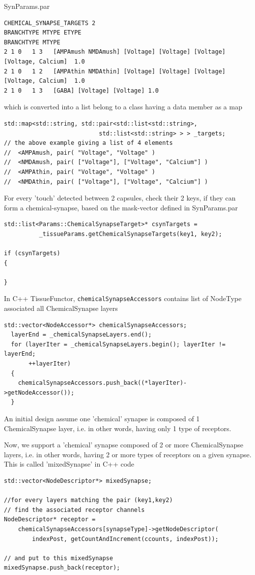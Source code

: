 SynParams.par
\begin{verbatim}
CHEMICAL_SYNAPSE_TARGETS 2
BRANCHTYPE MTYPE ETYPE
BRANCHTYPE MTYPE
2 1 0   1 3   [AMPAmush NMDAmush] [Voltage] [Voltage] [Voltage] [Voltage, Calcium]  1.0
2 1 0   1 2   [AMPAthin NMDAthin] [Voltage] [Voltage] [Voltage] [Voltage, Calcium]  1.0
2 1 0   1 3   [GABA] [Voltage] [Voltage] 1.0
\end{verbatim}
which is converted into a list belong to a class having a
data member as a map
\begin{verbatim}
std::map<std::string, std::pair<std::list<std::string>,
                           std::list<std::string> > > _targets;
// the above example giving a list of 4 elements
//  <AMPAmush, pair( "Voltage", "Voltage" )
//  <NMDAmush, pair( ["Voltage"], ["Voltage", "Calcium"] )
//  <AMPAthin, pair( "Voltage", "Voltage" )
//  <NMDAthin, pair( ["Voltage"], ["Voltage", "Calcium"] )
\end{verbatim}

For every 'touch' detected between 2 capsules, check their 2 keys, if they can
form a chemical-synapse, based on the mask-vector defined in SynParams.par
\begin{verbatim}
std::list<Params::ChemicalSynapseTarget>* csynTargets =
          _tissueParams.getChemicalSynapseTargets(key1, key2);

if (csynTargets)
{

}
\end{verbatim}

In C++ TissueFunctor, \verb!chemicalSynapseAccessors! contains list of NodeType
associated all ChemicalSynapse layers
\begin{verbatim}
std::vector<NodeAccessor*> chemicalSynapseAccessors;
  layerEnd = _chemicalSynapseLayers.end();
  for (layerIter = _chemicalSynapseLayers.begin(); layerIter != layerEnd;
       ++layerIter)
  {
    chemicalSynapseAccessors.push_back((*layerIter)->getNodeAccessor());
  }
\end{verbatim}

An initial design assume one 'chemical' synapse is composed of 1 ChemicalSynapse
layer, i.e. in other words, having only 1 type of receptors. 

Now, we support a 'chemical' synapse composed of 2 or more ChemicalSynapse
layers, i.e. in other words, having 2 or more types of receptors on a given
synapse. This is called 'mixedSynapse' in C++ code
\begin{verbatim}
std::vector<NodeDescriptor*> mixedSynapse;

//for every layers matching the pair (key1,key2)
// find the associated receptor channels
NodeDescriptor* receptor =
    chemicalSynapseAccessors[synapseType]->getNodeDescriptor(
        indexPost, getCountAndIncrement(ccounts, indexPost));

// and put to this mixedSynapse
mixedSynapse.push_back(receptor);
              
\end{verbatim}

